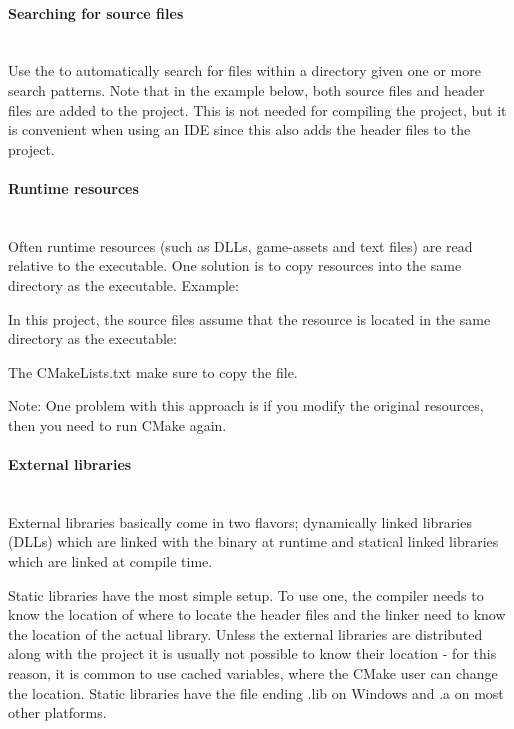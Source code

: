 \documentclass[11pt,a4paper,landscape]{scrartcl} %
\newcommand{\sectiontitle}[1]{\paragraph{#1} \ \\} %
\begin{document}
\begin{multicols}{2}
\sectiontitle{Searching for source files}

Use the  to automatically search for files within a directory given one or more search patterns. Note that in the example below, both source files and header files are added to the project. This is not needed for compiling the project, but it is convenient when using an IDE since this also adds the header files to the project.



\sectiontitle{Runtime resources}

Often runtime resources (such as DLLs, game-assets and text files) are read relative to the executable. One solution is to copy resources into the same directory as the executable. Example:

\vspace{\baselineskip} %
\noindent{}

In this project, the source files assume that the resource is located in the same directory as the executable:



The CMakeLists.txt make sure to copy the file. 



Note: One problem with this approach is if you modify the original resources, then you need to run CMake again.

\sectiontitle{External libraries}

External libraries basically come in two flavors; dynamically linked libraries (DLLs) which are linked with the binary at runtime and statical linked libraries which are linked at compile time.

Static libraries have the most simple setup. To use one, the compiler needs to know the location of where to locate the header files and the linker need to know the location of the actual library. Unless the external libraries are distributed along with the project it is usually not possible to know their location - for this reason, it is common to use cached variables, where the CMake user can change the location. Static libraries have the file ending .lib on Windows and .a on most other platforms. 


\end{multicols}
\end{document}
